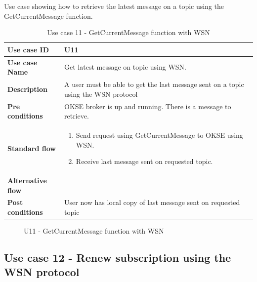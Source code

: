 Use case showing how to retrieve the latest message on a topic using the GetCurrentMessage function.


\begin{table}[ht!]
\centering
\begin{tabular}{|l|p{5cm}|}
\hline
\textbf{Use case ID} & U11 \\ \hline
\textbf{Use case Name} & Get latest message on topic using WSN.\\ \hline
\textbf{Description} & A user must be able to get the last message sent on a topic using the WSN protocol\\ \hline
\textbf{Pre conditions} & OKSE broker is up and running. There is a message to retrieve.\\ \hline
\textbf{Standard flow} & \begin{enumerate}
\item Send request using GetCurrentMessage to OKSE using WSN.
\item Receive last message sent on requested topic.
\end{enumerate} \\ \hline
\textbf{Alternative flow} & \\ \hline
\textbf{Post conditions} & User now has local copy of last message sent on requested topic  
  \\ \hline
\end{tabular}
\caption{Use case 11 - GetCurrentMessage function with WSN}
\label{uc11}
\end{table}

\begin{center}
  \begin{figure}[ht!]
    \caption{U11 - GetCurrentMessage function with WSN}
    \label{fig:u11}
  \end{figure}
\end{center}

\clearpage

\subsection{Use case 12 - Renew subscription using the WSN protocol}
\label{subsec:requirements_engineering-use_cases-renew_sub_wsn}

